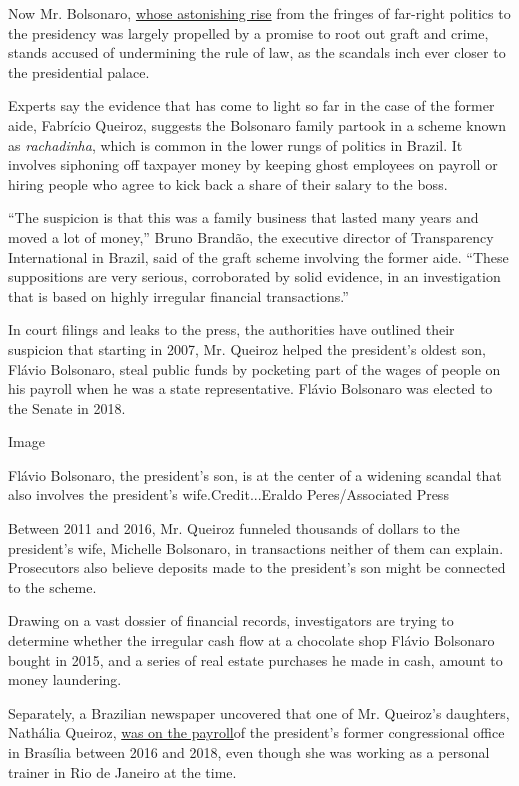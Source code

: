 Now Mr. Bolsonaro,
\href{https://www.nytimes3xbfgragh.onion/2018/10/29/world/americas/jair-bolsonaro-brazil-profile.html}{whose
astonishing rise} from the fringes of far-right politics to the
presidency was largely propelled by a promise to root out graft and
crime, stands accused of undermining the rule of law, as the scandals
inch ever closer to the presidential palace.

Experts say the evidence that has come to light so far in the case of
the former aide, Fabrício Queiroz, suggests the Bolsonaro family partook
in a scheme known as \emph{rachadinha}, which is common in the lower
rungs of politics in Brazil. It involves siphoning off taxpayer money by
keeping ghost employees on payroll or hiring people who agree to kick
back a share of their salary to the boss.

``The suspicion is that this was a family business that lasted many
years and moved a lot of money,'' Bruno Brandão, the executive director
of Transparency International in Brazil, said of the graft scheme
involving the former aide. ``These suppositions are very serious,
corroborated by solid evidence, in an investigation that is based on
highly irregular financial transactions.''

In court filings and leaks to the press, the authorities have outlined
their suspicion that starting in 2007, Mr. Queiroz helped the
president's oldest son, Flávio Bolsonaro, steal public funds by
pocketing part of the wages of people on his payroll when he was a state
representative. Flávio Bolsonaro was elected to the Senate in 2018.

Image

Flávio Bolsonaro, the president's son, is at the center of a widening
scandal that also involves the president's wife.Credit...Eraldo
Peres/Associated Press

Between 2011 and 2016, Mr. Queiroz funneled thousands of dollars to the
president's wife, Michelle Bolsonaro, in transactions neither of them
can explain. Prosecutors also believe deposits made to the president's
son might be connected to the scheme.

Drawing on a vast dossier of financial records, investigators are trying
to determine whether the irregular cash flow at a chocolate shop Flávio
Bolsonaro bought in 2015, and a series of real estate purchases he made
in cash, amount to money laundering.

Separately, a Brazilian newspaper uncovered that one of Mr. Queiroz's
daughters, Nathália Queiroz,
\href{https://www1.folha.uol.com.br/poder/2018/12/ex-secretaria-parlamentar-de-jair-bolsonaro-atuava-como-personal-trainer-no-rio.shtml?utm_source=whatsapp\&utm_medium=social\&utm_campaign=compwa}{was
on the payroll}of the president's former congressional office in
Brasília between 2016 and 2018, even though she was working as a
personal trainer in Rio de Janeiro at the time.

